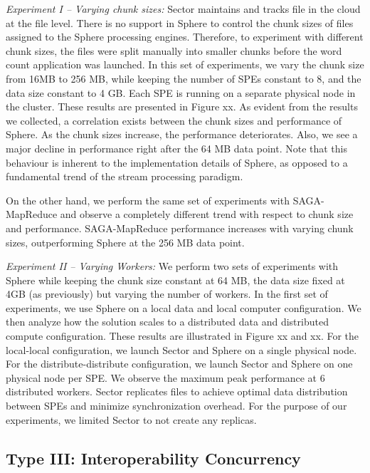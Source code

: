 \documentclass[3p,twocolumn]{elsarticle}
\begin{document}
{\it Experiment I -- Varying chunk sizes:} Sector maintains and tracks
file in the cloud at the file level. There is no support in Sphere to
control the chunk sizes of files assigned to the Sphere processing
engines. Therefore, to experiment with different chunk sizes, the
files were split manually into smaller chunks before the word count
application was launched. In this set of experiments, we vary the
chunk size from 16MB to 256 MB, while keeping the number of SPEs
constant to 8, and the data size constant to 4 GB. Each SPE is running
on a separate physical node in the cluster. These results are
presented in Figure xx. As evident from the results we collected, a
correlation exists between the chunk sizes and performance of Sphere.
As the chunk sizes increase, the performance deteriorates. Also, we
see a major decline in performance right after the 64 MB data
point. Note that this behaviour is inherent to the implementation
details of Sphere, as opposed to a fundamental trend of the stream
processing paradigm.

On the other hand, we perform the same set of experiments with
SAGA-MapReduce and observe a completely different trend with respect
to chunk size and performance. SAGA-MapReduce performance increases
with varying chunk sizes, outperforming Sphere at the 256 MB data
point.   

{\it Experiment II -- Varying Workers:} We perform two sets of
experiments with Sphere  while keeping the chunk size constant at 64 MB, the
data size fixed at 4GB (as previously) but varying the number of
workers. In the first set of experiments, we use Sphere on a local
data and local computer configuration. We then analyze how the
solution scales to a distributed data and distributed compute
configuration. These results are illustrated in Figure xx and xx.  For
the local-local configuration, we launch Sector and Sphere on a single
physical node. For the distribute-distribute configuration, we launch
Sector and Sphere on one physical node per SPE.  We observe the
maximum peak performance at 6 distributed workers. Sector replicates
files to achieve optimal data distribution between SPEs and minimize
synchronization overhead. For the purpose of our experiments, we
limited Sector to not create any replicas.

\subsection{Type  III: Interoperability Concurrency}
\end{document}
